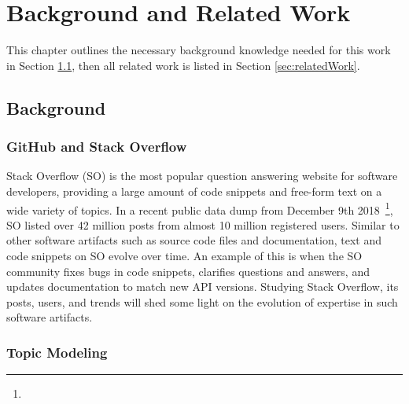 \chapter{Background and Related Work\label{chap:relatedWork}}
    This chapter outlines the necessary background knowledge needed for this work in Section \ref{sec:background}, then all related work is listed in Section \ref{sec:relatedWork}.
    
\section{Background} \label{sec:background}

    
    \subsection{GitHub and Stack Overflow}
    
        Stack Overflow (SO) is the most popular question answering website for software developers, providing a large amount of code snippets and free-form text on a wide variety of topics. In a recent public data dump from December 9th 2018~\footnote{}, SO listed over 42 million posts from almost 10 million registered users. Similar to other software artifacts such as source code files and documentation, text and code snippets on SO evolve over time. An example of this is when the SO community fixes bugs in code snippets, clarifies questions and answers, and updates documentation to match new API versions. Studying Stack Overflow, its posts, users, and trends will shed some light on the evolution of expertise in such software artifacts.
        
    
    \subsection{Topic Modeling}
        
